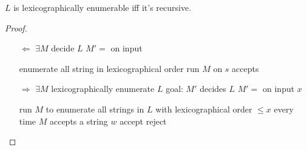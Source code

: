 \begin{theorem}
    $L$ is lexicographically enumerable iff it's recursive. 
\end{theorem}
\begin{proof}\quad

    \begin{itemize}
        \item [$\Leftarrow$] $\exists M$ decide $L$
        \subitem $M'=$ on input
        \begin{algorithm}[H]
            \caption{$M'$}
            \begin{algorithmic}
                \State enumerate all string in lexicographical order
                    \State run $M$ on $s$
                        \State accepts 
                    \EndIf
                \EndFor
            \end{algorithmic}
        \end{algorithm}
        \item [$\Rightarrow$] $\exists M$ lexicographically enumerate $L$
        \subitem goal: $M'$ decides $L$
        \subitem $M'=$ on input $x$
        \begin{algorithm}[H]
            \caption{$M'$}
            \begin{algorithmic}
                \State run $M$ to enumerate all strings in $L$ with lexicographical order $\le x$
                \State every time $M$ accepts a string $w$
                    \State accept
                \Else
                    \State reject 
                \EndIf
            \end{algorithmic}
        \end{algorithm}
        
    \end{itemize}
\end{proof}
